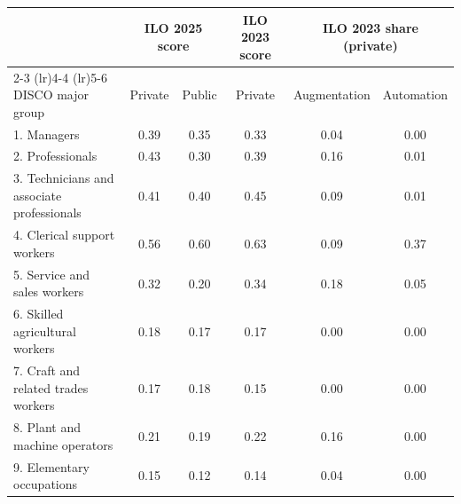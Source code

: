 \begin{tabular}{lccccc}
\toprule
 & \multicolumn{2}{c}{ILO 2025 score} & ILO 2023 score & \multicolumn{2}{c}{ILO 2023 share (private)} \\
\cmidrule(lr){2-3} \cmidrule(lr){4-4} \cmidrule(lr){5-6}
DISCO major group & Private & Public & Private & Augmentation & Automation \\
\midrule
1. Managers & 0.39 & 0.35 & 0.33 & 0.04 & 0.00 \\
2. Professionals & 0.43 & 0.30 & 0.39 & 0.16 & 0.01 \\
3. Technicians and associate professionals & 0.41 & 0.40 & 0.45 & 0.09 & 0.01 \\
4. Clerical support workers & 0.56 & 0.60 & 0.63 & 0.09 & 0.37 \\
5. Service and sales workers & 0.32 & 0.20 & 0.34 & 0.18 & 0.05 \\
6. Skilled agricultural workers & 0.18 & 0.17 & 0.17 & 0.00 & 0.00 \\
7. Craft and related trades workers & 0.17 & 0.18 & 0.15 & 0.00 & 0.00 \\
8. Plant and machine operators & 0.21 & 0.19 & 0.22 & 0.16 & 0.00 \\
9. Elementary occupations & 0.15 & 0.12 & 0.14 & 0.04 & 0.00 \\
\bottomrule
\end{tabular}
